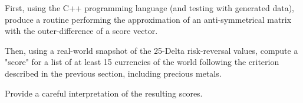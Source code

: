 \documentclass[a4paper]{article}
\newcommand{\1}{\textbf{1}}
\begin{document}
\par First, using the C++ programming language (and testing with generated data), produce a routine performing the approximation of an anti-symmetrical matrix with the outer-difference of a score vector.

\par Then, using a real-world snapshot of the 25-Delta risk-reversal values, compute a "score" for a list of at least 15 currencies of the world following the criterion described in the previous section, including precious metals.

\par Provide a careful interpretation of the resulting scores.


\end{document}
